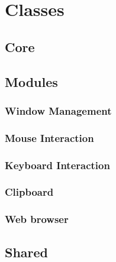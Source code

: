 \chapter{Classes}
\label{ch:class}

\newcommand{\cls}[1]{\paragraph{\textbf{#1}}}
\newcommand{\clsdsp}{\subparagraph{\textbf{Description:\\}}}
\newcommand{\clsdcl}{\subparagraph{\textbf{Declaration:\\}}}
\newcommand{\clscon}{\subparagraph{\textbf{Constructor:\\}}}
\newcommand{\clsfield}{\subparagraph{\textbf{Fields:\\}}}
\newcommand{\clsmethod}{\subparagraph{\textbf{Methods:\\}}}


\section{Core}

\section{Modules}

\subsection{Window Management}
\subsection{Mouse Interaction}
\subsection{Keyboard Interaction}
\subsection{Clipboard}
\subsection{Web browser}

\section{Shared}
